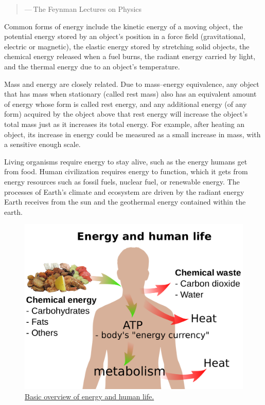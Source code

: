 \begin{quote}
--- The Feynman Lectures on Physics
\end{quote}

Common forms of energy include the kinetic energy of a moving object, the potential energy stored by an object's position in a force field (gravitational, electric or magnetic), the elastic energy stored by stretching solid objects, the chemical energy released when a fuel burns, the radiant energy carried by light, and the thermal energy due to an object's temperature.

Mass and energy are closely related. Due to mass--energy equivalence, any object that has mass when stationary (called rest mass) also has an equivalent amount of energy whose form is called rest energy, and any additional energy (of any form) acquired by the object above that rest energy will increase the object's total mass just as it increases its total energy. For example, after heating an object, its increase in energy could be measured as a small increase in mass, with a sensitive enough scale.

Living organisms require energy to stay alive, such as the energy humans get from food. Human civilization requires energy to function, which it gets from energy resources such as fossil fuels, nuclear fuel, or renewable energy. The processes of Earth's climate and ecosystem are driven by the radiant energy Earth receives from the sun and the geothermal energy contained within the earth.



\begin{figure}

{\centering \includegraphics[width=0.7\linewidth]{./figures/chemistry/Energy_and_life} 

}

\caption{\href{https://commons.wikimedia.org/wiki/File:Energy_and_life.svg}{Basic overview of energy and human life.}}\label{fig:energylife}
\end{figure}

